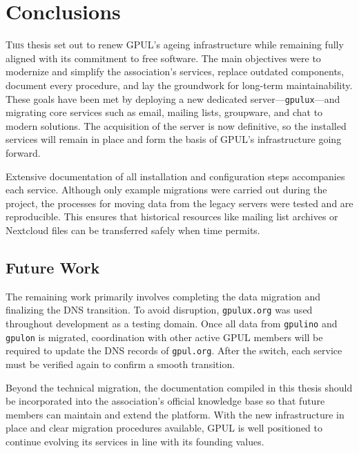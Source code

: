 %

\chapter{Conclusions}
\label{chap:conclusions}

\lettrine{T}{his} thesis set out to renew GPUL's ageing infrastructure while remaining fully aligned with its commitment to free software. The main objectives were to modernize and simplify the association's services, replace outdated components, document every procedure, and lay the groundwork for long-term maintainability. These goals have been met by deploying a new dedicated server---\texttt{gpulux}---and migrating core services such as email, mailing lists, groupware, and chat to modern solutions. The acquisition of the server is now definitive, so the installed services will remain in place and form the basis of GPUL's infrastructure going forward.

Extensive documentation of all installation and configuration steps accompanies each service. Although only example migrations were carried out during the project, the processes for moving data from the legacy servers were tested and are reproducible. This ensures that historical resources like mailing list archives or Nextcloud files can be transferred safely when time permits.

\section*{Future Work}

The remaining work primarily involves completing the data migration and finalizing the DNS transition. To avoid disruption, \texttt{gpulux.org} was used throughout development as a testing domain. Once all data from \texttt{gpulino} and \texttt{gpulon} is migrated, coordination with other active GPUL members will be required to update the DNS records of \texttt{gpul.org}. After the switch, each service must be verified again to confirm a smooth transition.

Beyond the technical migration, the documentation compiled in this thesis should be incorporated into the association's official knowledge base so that future members can maintain and extend the platform. With the new infrastructure in place and clear migration procedures available, GPUL is well positioned to continue evolving its services in line with its founding values.
